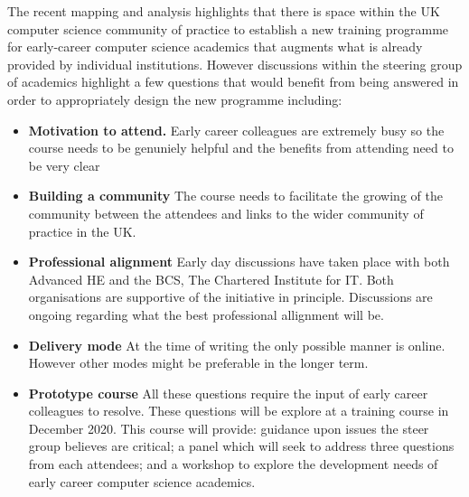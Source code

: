\documentclass[sigconf]{acmart}
\begin{document}
The recent mapping and analysis highlights that there is space within the UK computer science community of practice to establish a new training programme for early-career computer science academics that augments what is already provided by individual institutions. However discussions within the steering group of academics highlight a few questions that would benefit from being answered in order to appropriately design the new programme including:
\begin{itemize}
	\item \textbf{Motivation to attend.} Early career colleagues are extremely busy so the course needs to be genuniely helpful and the benefits from attending need to be very clear
	\item \textbf{Building a community} The course needs to facilitate the growing of the community between the attendees and links to the wider community of practice in the UK.
	\item \textbf{Professional alignment} Early day discussions have taken place with both Advanced HE and the BCS, The Chartered Institute for IT. Both organisations are supportive of the initiative in principle. Discussions are ongoing regarding what the best professional allignment will be.
	\item \textbf{Delivery mode} At the time of writing the only possible manner is online. However other modes might be preferable in the longer term.
	\item \textbf{Prototype course} All these questions require the input of early career colleagues to resolve. These questions will be explore at a training course in December 2020. This course will provide: guidance upon issues the steer group believes are critical; a panel which will seek to address three questions from each attendees; and a workshop to explore the development needs of early career computer science academics. 
\end{itemize}
 
\end{document}
